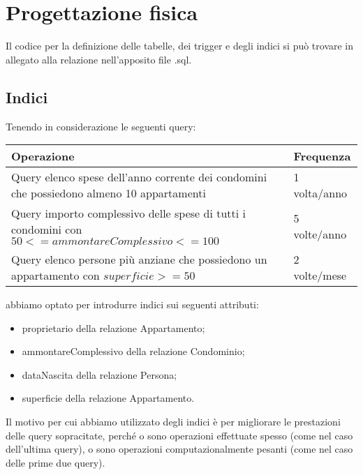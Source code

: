 \section{Progettazione fisica}
\label{fisico}

Il codice per la definizione delle tabelle, dei trigger e degli indici si può trovare in allegato alla relazione nell'apposito file .sql. 

\subsection{Indici}

Tenendo in considerazione le seguenti query:

\begin{tabular}{|p{320pt}|l|}
	\hline
	\textbf{Operazione} & \textbf{Frequenza} \\ \hline
	Query elenco spese dell'anno corrente dei condomini che possiedono almeno 10 appartamenti & 1 volta/anno \\ \hline
	Query importo complessivo delle spese di tutti i condomini con $50 <= ammontareComplessivo <= 100$ & 5 volte/anno \\ \hline
	Query elenco persone più anziane che possiedono un appartamento con $superficie >= 50$ & 2 volte/mese \\ \hline
\end{tabular}

abbiamo optato per introdurre indici sui seguenti attributi:

\begin{itemize}
	\item proprietario della relazione Appartamento;
	\item ammontareComplessivo della relazione Condominio;
	\item dataNascita della relazione Persona;
	\item superficie della relazione Appartamento.
\end{itemize}

Il motivo per cui abbiamo utilizzato degli indici è per migliorare le prestazioni delle query sopracitate, perché o sono operazioni effettuate spesso (come nel caso dell'ultima query), o sono operazioni computazionalmente pesanti (come nel caso delle prime due query).
